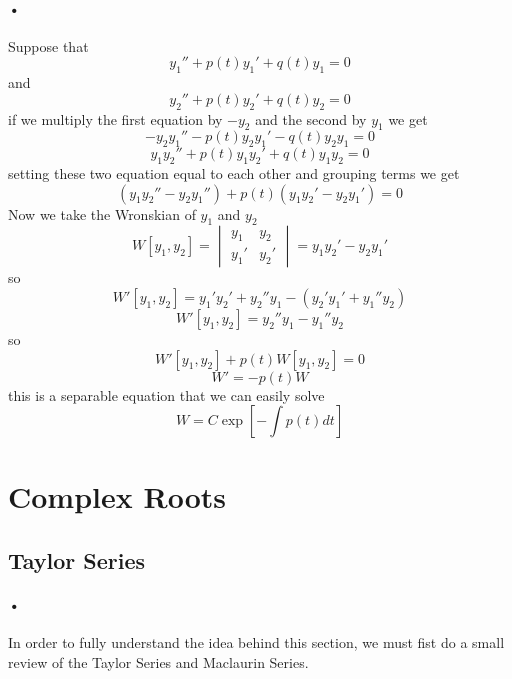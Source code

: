 \documentclass[font =22]{report}
\begin{document}
\paragraph{•}
Suppose that 
\[
y_1'' + p(t)y_1' + q(t)y_1 = 0 
\]
and
\[
y_2'' + p(t)y_2' + q(t)y_2 = 0 
\]
if we multiply the first equation by $-y_2$ and the second by $y_1$ we get
\[
-y_2y_1'' - p(t)y_2y_1' - q(t)y_2y_1 = 0 
\]
\[
y_1y_2'' + p(t)y_1y_2' + q(t)y_1y_2 = 0 
\]
setting these two equation equal to each other and grouping terms we get 
\[
(y_1y_2''-y_2y_1'') + p(t)(y_1y_2'-y_2y_1') = 0
\] 
Now we take the Wronskian of $y_1$ and $y_2$
\[
W[y_1,y_2] = 
\begin{vmatrix}
y_1 & y_2\\
y_1' & y_2'
\end{vmatrix}
= y_1y_2'-y_2y_1'
\]
so 
\[
W'[y_1,y_2] = y_1'y_2'+y_2''y_1 - (y_2'y_1'+y_1''y_2)
\]
\[
W'[y_1,y_2] = y_2'' y_1 - y_1''y_2
\]
so 
\[
W'[y_1,y_2] + p(t)W[y_1,y_2] = 0
\]
\[
W'  = -p(t)W
\]
this is a separable equation that we can easily solve 
\[
W = C\exp\left[-\int{p(t)}dt\right]
\] 
\section{Complex Roots}
\subsection{Taylor Series}
\paragraph*{•}
In order to fully understand the idea behind this section, we must fist do a small review of the Taylor Series and Maclaurin Series.
\end{document}
